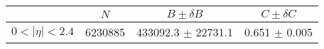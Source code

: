\begin{tabular}{lccc}
\hline
    &   $N$   & $B \pm \delta B$  &  $C \pm \delta C$ \\
\hline
$0 < |\eta| <2.4$              & 6230885    & 433092.3   $\pm$ 22731.1 & 0.651      $\pm$ 0.005 \\
\hline
\end{tabular}
